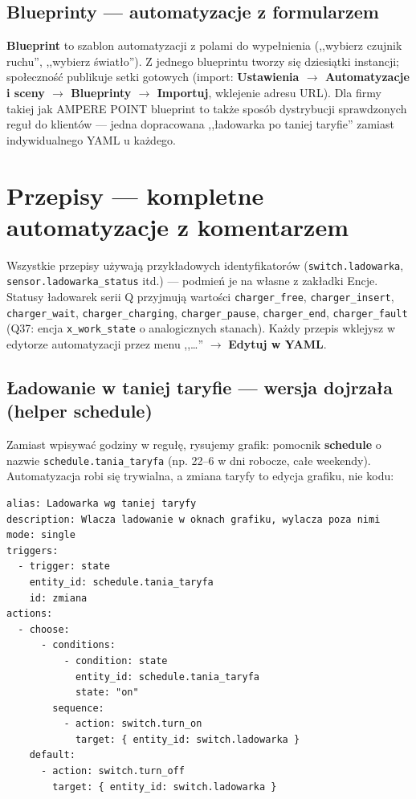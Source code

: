 \documentclass[11pt,a4paper]{article}
\begin{document}
\subsection{Blueprinty --- automatyzacje z formularzem}

\textbf{Blueprint} to szablon automatyzacji z polami do wypełnienia (,,wybierz czujnik ruchu'', ,,wybierz światło''). Z jednego blueprintu tworzy się dziesiątki instancji; społeczność publikuje setki gotowych (import: \textbf{Ustawienia $\to$ Automatyzacje i sceny $\to$ Blueprinty $\to$ Importuj}, wklejenie adresu URL). Dla firmy takiej jak AMPERE POINT blueprint to także sposób dystrybucji sprawdzonych reguł do klientów --- jedna dopracowana ,,ładowarka po taniej taryfie'' zamiast indywidualnego YAML u każdego.

\section{Przepisy --- kompletne automatyzacje z komentarzem}
\label{sec:przepisy}

Wszystkie przepisy używają przykładowych identyfikatorów (\texttt{switch.ladowarka}, \texttt{sensor.ladowarka\_status} itd.) --- podmień je na własne z zakładki Encje. Statusy ładowarek serii Q przyjmują wartości \texttt{charger\_free}, \texttt{charger\_insert}, \texttt{charger\_wait}, \texttt{charger\_charging}, \texttt{charger\_pause}, \texttt{charger\_end}, \texttt{charger\_fault} (Q37: encja \texttt{x\_work\_state} o analogicznych stanach). Każdy przepis wklejysz w edytorze automatyzacji przez menu ,,\ldots'' $\to$ \textbf{Edytuj w YAML}.

\subsection{Ładowanie w taniej taryfie --- wersja dojrzała (helper schedule)}
\label{sec:przepis-taryfa}

Zamiast wpisywać godziny w regułę, rysujemy grafik: pomocnik \textbf{schedule} o nazwie \texttt{schedule.tania\_taryfa} (np. 22--6 w dni robocze, całe weekendy). Automatyzacja robi się trywialna, a zmiana taryfy to edycja grafiku, nie kodu:

\begin{lstlisting}
alias: Ladowarka wg taniej taryfy
description: Wlacza ladowanie w oknach grafiku, wylacza poza nimi
mode: single
triggers:
  - trigger: state
    entity_id: schedule.tania_taryfa
    id: zmiana
actions:
  - choose:
      - conditions:
          - condition: state
            entity_id: schedule.tania_taryfa
            state: "on"
        sequence:
          - action: switch.turn_on
            target: { entity_id: switch.ladowarka }
    default:
      - action: switch.turn_off
        target: { entity_id: switch.ladowarka }
\end{lstlisting}
\end{document}
